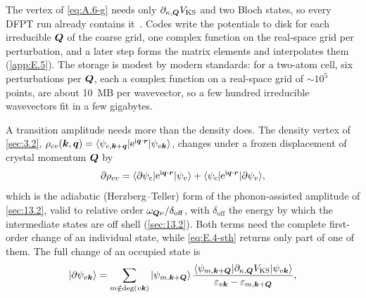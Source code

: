 The vertex of \cref{eq:A.6-g} needs only $\partial_{\kappa,\bm{Q}}V_{\mathrm{KS}}$ and two Bloch states, so every DFPT run already contains it~\cite[Sect.~III.B.3]{giustino2017electron}. Codes write the potentials to disk for each irreducible $\bm{Q}$ of the coarse grid, one complex function on the real-space grid per perturbation, and a later step forms the matrix elements and interpolates them (\cref{app:E.5}). The storage is modest by modern standards: for a two-atom cell, six perturbations per $\bm{Q}$, each a complex function on a real-space grid of $\sim 10^5$ points, are about \SI{10}{MB} per wavevector, so a few hundred irreducible wavevectors fit in a few gigabytes.

A transition amplitude needs more than the density does. The density vertex of \cref{sec:3.2}, $\rho_{cv}(\bm{k},\bm{q}) = \langle\psi_{c,\bm{k}+\bm{q}}|\mathrm{e}^{\mathrm{i}\bm{q}\cdot\bm{r}}|\psi_{v\bm{k}}\rangle$, changes under a frozen displacement of crystal momentum $\bm{Q}$ by
\begin{equation}
  \partial\rho_{cv} = \langle\partial\psi_{c}|\mathrm{e}^{\mathrm{i}\bm{q}\cdot\bm{r}}|\psi_{v}\rangle + \langle\psi_{c}|\mathrm{e}^{\mathrm{i}\bm{q}\cdot\bm{r}}|\partial\psi_{v}\rangle ,
  \label{eq:E.4-drho}
\end{equation}
which is the adiabatic (Herzberg--Teller) form of the phonon-assisted amplitude of \cref{sec:13.2}, valid to relative order $\omega_{\bm{Q}\nu}/\delta_{\mathrm{off}}$, with $\delta_{\mathrm{off}}$ the energy by which the intermediate states are off shell (\cref{sec:13.2}). Both terms need the complete first-order change of an individual state, while \cref{eq:E.4-sth} returns only part of one of them. The full change of an occupied state is
\begin{equation}
  |\partial\psi_{v\bm{k}}\rangle = \sum_{m\notin\mathrm{deg}(v\bm{k})}|\psi_{m,\bm{k}+\bm{Q}}\rangle\,
  \frac{\langle\psi_{m,\bm{k}+\bm{Q}}|\partial_{\kappa,\bm{Q}}V_{\mathrm{KS}}|\psi_{v\bm{k}}\rangle}{\varepsilon_{v\bm{k}} - \varepsilon_{m,\bm{k}+\bm{Q}}} ,
  \label{eq:E.4-dpsi}
\end{equation}
